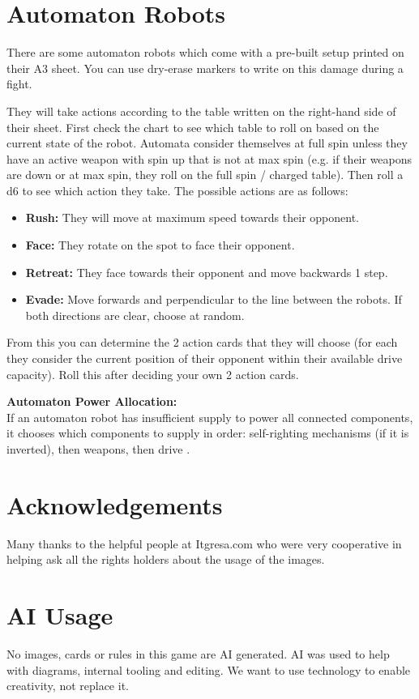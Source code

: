 \documentclass[11pt,a4paper]{article}
\newcommand{\inlineIcon}[1]{\raisebox{-0.22ex}{\resizebox{!}{1.15em}{#1}}}
\begin{document}
\clearpage



\section{Automaton Robots}

There are some automaton robots which come with a pre-built setup printed on their A3 sheet. You can use dry-erase markers to write on this damage during a fight.

They will take actions according to the table written on the right-hand side of their sheet.
First check the chart to see which table to roll on based on the current state of the robot. Automata consider themselves at full spin unless they have an active weapon with spin up that is not at max spin (e.g. if their weapons are down or at max spin, they roll on the full spin / charged table).
Then roll a d6 to see which action they take.
The possible actions are as follows:
\begin{itemize}[itemsep=1pt, topsep=0.5pt, parsep=0pt]
  \item \textbf{Rush:} They will move at maximum speed towards their opponent.
  \item \textbf{Face:} They rotate on the spot to face their opponent.
  \item \textbf{Retreat:} They face towards their opponent and move backwards 1 step.
  \item \textbf{Evade:} Move forwards and perpendicular to the line between the robots. If both directions are clear, choose at random.
\end{itemize}
From this you can determine the 2 action cards that they will choose (for each they consider the current position of their opponent within their available drive capacity). 
Roll this after deciding your own 2 action cards.

\vspace{0.3em}
\noindent\textbf{Automaton Power Allocation:}\\
If an automaton robot has insufficient supply to power all connected components, it chooses which components to supply in order: self-righting mechanisms (if it is inverted), then weapons, then drive \inlineIcon{\resourceM}.



\section{Acknowledgements}
Many thanks to the helpful people at Itgresa.com who were very cooperative in helping ask all the rights holders about the usage of the images.

\section{AI Usage}
No images, cards or rules in this game are AI generated. AI was used to help with diagrams, internal tooling and editing.
We want to use technology to enable creativity, not replace it.
\end{document}

